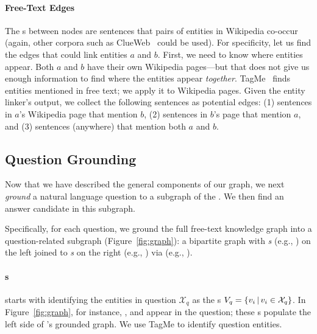 \paragraph{Free-Text Edges}

The \tweennode{}s between nodes are sentences that pairs of entities
in Wikipedia co-occur (again, other corpora such as
ClueWeb~\cite{callan2009clueweb09} could be used).
%
For specificity, let us find the edges that could link entities $a$ and $b$.
%
First, we need to know where entities appear.
%
Both $a$ and $b$ have their own Wikipedia pages---but that
does not give us enough information to find where the entities appear
\emph{together}.
%
TagMe~\cite{ferragina2010tagme} finds entities mentioned in free text;
we apply it to Wikipedia pages.
%
Given the entity linker's output, we collect the following sentences
as potential edges: (1) sentences in $a$'s Wikipedia page that mention
$b$, (2) sentences in $b$'s page that mention $a$, and (3) sentences
(anywhere) that mention both $a$ and $b$.

\subsection{Question Grounding}

Now that we have described the general components of our graph, we
next \textit{ground} a natural language question to a
subgraph of the .  We then find an answer candidate in
this subgraph.

Specifically, for each question, we ground the full free-text
knowledge graph into a question-related subgraph
(Figure~\ref{fig:graph}): a bipartite graph with \emph{\leftnode{}s}
(e.g., ) on the left joined to
\emph{\rightnode{}s} on the right (e.g., ) via
\emph{\tweennode{}} (e.g., ).

\paragraph{\leftnode{}s}

\name{} starts with identifying the entities in
question $\mathcal{X}_q$ as the \leftnode{}s $V_q=\{v_{i} \, | \, v_i \in
\mathcal{X}_q\}$.
%
In Figure~\ref{fig:graph}, for instance, ,
 and  appear in
the question; these \leftnode{}s populate the left side of
\name{}'s grounded graph. We use TagMe to identify question entities.

